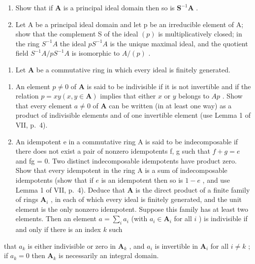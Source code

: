 \begin{enumerate}
\def\labelenumi{\alph{enumi})}
\item
  Show that if \(\mathbf{A}\) is a principal ideal domain then so is \(\mathbf{S}^{-1}\mathbf{A}\) .
\item
  Let A be a principal ideal domain and let p be an irreducible element of A; show that the complement S of the ideal \((p)\) is multiplicatively closed; in the ring \(S^{-1}A\) the ideal \(pS^{-1}A\) is the unique maximal ideal, and the quotient field \(S^{-1}A/pS^{-1}A\) is isomorphic to \(A/(p)\) .
\end{enumerate}

\begin{enumerate}
\def\labelenumi{\arabic{enumi})}
\setcounter{enumi}{4}
\tightlist
\item
  Let \(\mathbf{A}\) be a commutative ring in which every ideal is finitely generated.
\end{enumerate}

\begin{enumerate}
\def\labelenumi{\alph{enumi})}
\item
  An element \(p \neq 0\) of \(\mathbf{A}\) is said to be indivisible if it is not invertible and if the relation \(p = xy (x, y \in \mathbf{A})\) implies that either \(x\) or \(y\) belongs to \(A p\) . Show that every element \(a \neq 0\) of \(\mathbf{A}\) can be written (in at least one way) as a product of indivisible elements and of one invertible element (use Lemma 1 of VII, p.~4).
\item
  An idempotent e in a commutative ring A is said to be indecomposable if there does not exist a pair of nonzero idempotents f, g such that \(f + g = e\) and fg = 0. Two distinct indecomposable idempotents have product zero. Show that every idempotent in the ring A is a sum of indecomposable idempotents (show that if \(e\) is an idempotent then so is \(1 - e\) , and use Lemma 1 of VII, p.~4). Deduce that \(\mathbf{A}\) is the direct product of a finite family of rings \(\mathbf{A}_i\) , in each of which every ideal is finitely generated, and the unit element is the only nonzero idempotent. Suppose this family has at least two elements. Then an element \(a = \sum_{i} a_i\) (with \(a_i \in \mathbf{A}_i\) for all \(i\) ) is indivisible if and only if there is an index \(k\) such
\end{enumerate}

that \(a_{k}\) is either indivisible or zero in \(\mathbf{A}_{k}\) , and \(a_{i}\) is invertible in \(\mathbf{A}_{i}\) for all \(i \neq k\) ; if \(a_{k} = 0\) then \(\mathbf{A}_{k}\) is necessarily an integral domain.

